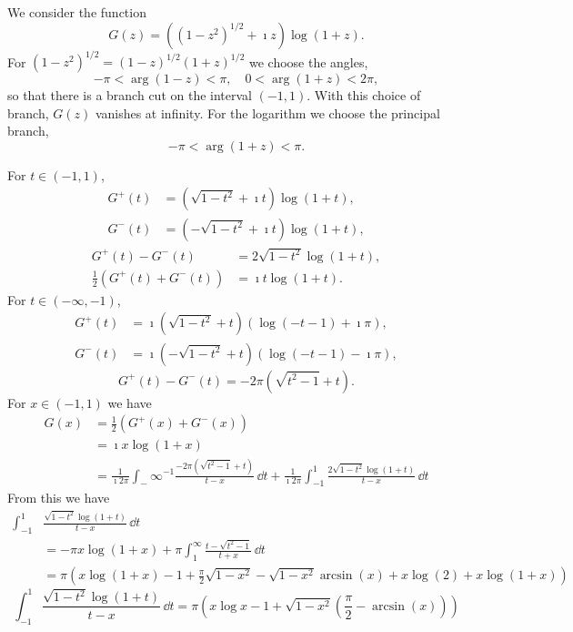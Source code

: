 \begin{Solution}
  We consider the function
  \[
  G(z) = \left( (1-z^2)^{1/2} + \imath z \right) \log(1+z).
  \]
  For $(1-z^2)^{1/2} = (1-z)^{1/2} (1+z)^{1/2}$ we choose the angles,
  \[
  -\pi < \arg(1-z) < \pi, \quad 0 < \arg(1+z) < 2\pi, 
  \]
  so that there is a branch cut on the interval $(-1,1)$.  With this choice
  of branch, $G(z)$ vanishes at infinity.  
  For the logarithm we choose the principal branch,
  \[
  -\pi < \arg(1+z) < \pi.
  \]

  For $t \in (-1,1)$,
  \begin{align*}
    G^+(t) &= \left( \sqrt{1-t^2} + \imath t \right) \log(1+t), \\
    G^-(t) &= \left( -\sqrt{1-t^2} + \imath t \right) \log(1+t), 
  \end{align*}
  \begin{align*}
    G^+(t) - G^-(t) &= 2 \sqrt{1-t^2} \log(1+t), \\
    \frac{1}{2} \left( G^+(t) + G^-(t) \right) &= \imath t \log(1+t).
  \end{align*}
  For $t \in (-\infty,-1)$,
  \begin{align*}
    G^+(t) &= \imath \left( \sqrt{1-t^2} + t \right) \left( \log(-t-1) + \imath \pi \right),\\
    G^-(t) &= \imath \left( -\sqrt{1-t^2} + t \right) \left( \log(-t-1) - \imath \pi \right), 
  \end{align*}
  \[
  G^+(t) - G^-(t) = - 2 \pi \left( \sqrt{t^2 - 1} + t \right).
  \]
  For $x \in (-1,1)$ we have
  \begin{align*}
    G(x)
    &= \frac{1}{2} \left( G^+(x) + G^-(x) \right) \\
    &= \imath x \log(1+x) \\
    &= \frac{1}{\imath 2 \pi} \int_-\infty^{-1} 
    \frac{-2 \pi (\sqrt{t^2-1} + t)}{t-x} \,\dd t
    + \frac{1}{\imath 2 \pi} \int_{-1}^1
    \frac{2 \sqrt{1-t^2} \log(1+t)}{t-x} \,\dd t 
  \end{align*}
  From this we have
  \begin{align*}
    \int_{-1}^1 &\frac{\sqrt{1-t^2} \log(1+t)}{t-x} \,\dd t \\
    &= - \pi x \log(1+x) 
    + \pi \int_1^\infty \frac{t - \sqrt{t^2-1}}{t+x} \,\dd t \\
    &= \pi \left( x \log(1+x) - 1 + \frac{\pi}{2} \sqrt{1-x^2} 
      - \sqrt{1-x^2} \arcsin(x) +x \log(2) + x \log(1+x) \right)
  \end{align*}
  \[
  \boxed{
    \int_{-1}^1 \frac{\sqrt{1-t^2} \log(1+t)}{t-x} \,\dd t
    = \pi \left( x \log x - 1 + \sqrt{1-x^2} \left( \frac{\pi}{2}
        - \arcsin(x) \right) \right)
    }
  \]
\end{Solution}



